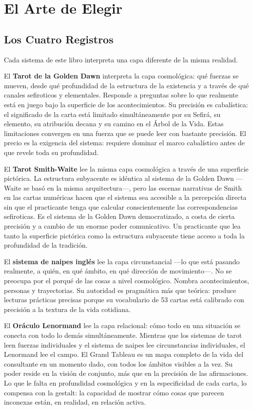 \section{El Arte de Elegir}\label{final-chapter-the-four-instruments-in-practice}

\subsection{Los Cuatro Registros}\label{the-four-registers}

Cada sistema de este libro interpreta una capa diferente de la misma realidad.

El \textbf{Tarot de la Golden Dawn} interpreta la capa cosmológica: qué fuerzas se mueven, desde qué profundidad de la estructura de la existencia y a través de qué canales sefiroticos y elementales. Responde a preguntas sobre lo que realmente está en juego bajo la superficie de los acontecimientos. Su precisión es cabalística: el significado de la carta está limitado simultáneamente por su Sefirá, su elemento, su atribución decana y su camino en el Árbol de la Vida. Estas limitaciones convergen en una fuerza que se puede leer con bastante precisión. El precio es la exigencia del sistema: requiere dominar el marco cabalístico antes de que revele toda su profundidad.

El \textbf{Tarot Smith-Waite} lee la misma capa cosmológica a través de una superficie pictórica. La estructura subyacente es idéntica al sistema de la Golden Dawn ---Waite se basó en la misma arquitectura---, pero las escenas narrativas de Smith en las cartas numéricas hacen que el sistema sea accesible a la percepción directa sin que el practicante tenga que calcular conscientemente las correspondencias sefiroticas. Es el sistema de la Golden Dawn democratizado, a costa de cierta precisión y a cambio de un enorme poder comunicativo. Un practicante que lea tanto la superficie pictórica como la estructura subyacente tiene acceso a toda la profundidad de la tradición.

El \textbf{sistema de naipes inglés} lee la capa circunstancial ---lo que está pasando realmente, a quién, en qué ámbito, en qué dirección de movimiento---. No se preocupa por el porqué de las cosas a nivel cosmológico. Nombra acontecimientos, personas y trayectorias. Su autoridad es pragmática más que teórica: produce lecturas prácticas precisas porque su vocabulario de 53 cartas está calibrado con precisión a la textura de la vida cotidiana.

El \textbf{Oráculo Lenormand} lee la capa relacional: cómo todo en una situación se conecta con todo lo demás simultáneamente. Mientras que los sistemas de tarot leen fuerzas individuales y el sistema de naipes lee circunstancias individuales, el Lenormand lee el campo. El Grand Tableau es un mapa completo de la vida del consultante en un momento dado, con todos los ámbitos visibles a la vez. Su poder reside en la visión de conjunto, más que en la precisión de las afirmaciones. Lo que le falta en profundidad cosmológica y en la especificidad de cada carta, lo compensa con la gestalt: la capacidad de mostrar cómo cosas que parecen inconexas están, en realidad, en relación activa.

